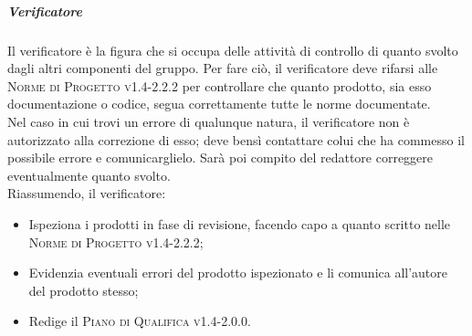 \subparagraph{Verificatore}
Il verificatore è la figura che si occupa delle attività di controllo di quanto svolto dagli altri componenti del gruppo. Per fare ciò, il verificatore deve rifarsi alle \textsc{Norme di Progetto v1.4-2.2.2} per controllare che quanto prodotto, sia esso documentazione o codice, segua correttamente tutte le norme documentate. \\
Nel caso in cui trovi un errore di qualunque natura, il verificatore non è autorizzato alla correzione di esso; deve bensì contattare colui che ha commesso il possibile errore e comunicarglielo. Sarà poi compito del redattore correggere eventualmente quanto svolto. \\
Riassumendo, il verificatore:
\begin{itemize}
  \item Ispeziona i prodotti in fase di revisione, facendo capo a quanto scritto nelle \textsc{Norme di Progetto v1.4-2.2.2};
  \item Evidenzia eventuali errori del prodotto ispezionato e li comunica all'autore del prodotto stesso;
  \item Redige il \textsc{Piano di Qualifica v1.4-2.0.0}.
\end{itemize}

